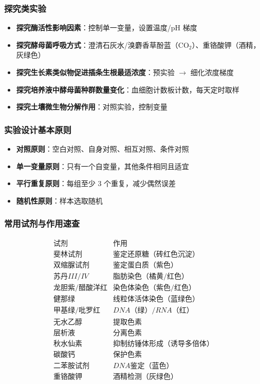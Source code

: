 \subsubsection{探究类实验}

\begin{itemize}
  \item \textbf{探究酶活性影响因素}：控制单一变量，设置温度/pH 梯度
  \item \textbf{探究酵母菌呼吸方式}：澄清石灰水/溴麝香草酚蓝（CO$_2$）、重铬酸钾（酒精，灰绿色）
  \item \textbf{探究生长素类似物促进插条生根最适浓度}：预实验 $\to$ 细化浓度梯度
  \item \textbf{探究培养液中酵母菌种群数量变化}：血细胞计数板计数，每天定时取样
  \item \textbf{探究土壤微生物分解作用}：对照实验，控制变量
\end{itemize}

\subsubsection{实验设计基本原则}

\begin{itemize}
  \item \textbf{对照原则}：空白对照、自身对照、相互对照、条件对照
  \item \textbf{单一变量原则}：只有一个自变量，其他条件相同且适宜
  \item \textbf{平行重复原则}：每组至少 3 个重复，减少偶然误差
  \item \textbf{随机性原则}：样本选取随机
\end{itemize}

\subsubsection{常用试剂与作用速查}

\[
\begin{array}{c|c}
\text{试剂} & \text{作用} \\ \hline
斐林试剂 & 鉴定还原糖（砖红色沉淀） \\
双缩脲试剂 & 鉴定蛋白质（紫色） \\
苏丹 III/IV & 脂肪染色（橘黄/红色） \\
龙胆紫/醋酸洋红 & 染色体染色（紫色/红色） \\
健那绿 & 线粒体活体染色（蓝绿色） \\
甲基绿/吡罗红 & DNA（绿）/RNA（红） \\
无水乙醇 & 提取色素 \\
层析液 & 分离色素 \\
秋水仙素 & 抑制纺锤体形成（诱导多倍体） \\
碳酸钙 & 保护色素 \\
二苯胺试剂 & DNA 鉴定（蓝色） \\
重铬酸钾 & 酒精检测（灰绿色）
\end{array}
\]

